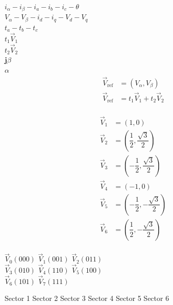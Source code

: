 \documentclass[11pt]{report}
\begin{document}
\begin{center}
	$ i_{\alpha} - i_{\beta} - i_a - i_b - i_c - \theta$ \\
	$ V_{\alpha} - V_{\beta} - i_d - i_q - V_d - V_q $ \\
	$ t_a - t_b - t_c $ \\
	$t_1\vec{V}_1$ \\
	$t_2\vec{V}_2$ \\
	$\mathbf{j}\beta$ \\
	$\alpha$\\


\begin{align*}
	\vec{V}_{\text{ref}} &= (V_{\alpha}, V_{\beta}) \\
	\vec{V}_{\text{ref}} &= t_1\vec{V}_1 + t_2\vec{V}_2\\
\end{align*}

	\begin{align*}
		\vec{V}_1 & = (1, 0)                                           \\
		\vec{V}_2 & = \left(\dfrac{1}{2}, \dfrac{\sqrt{3}}{2}\right)   \\
		\vec{V}_3 & = \left(-\dfrac{1}{2}, \dfrac{\sqrt{3}}{2}\right)  \\
		\vec{V}_4 & = (-1, 0)                                          \\
		\vec{V}_5 & = \left(-\dfrac{1}{2}, -\dfrac{\sqrt{3}}{2}\right) \\
		\vec{V}_6 & = \left(\dfrac{1}{2}, -\dfrac{\sqrt{3}}{2}\right)  \\
	\end{align*}

	$\vec{V}_0(000)$
	$\vec{V}_1(001)$
	$\vec{V}_2(011)$ \\
	$\vec{V}_3(010)$
	$\vec{V}_4(110)$
	$\vec{V}_5(100)$ \\
	$\vec{V}_6(101)$
	$\vec{V}_7(111)$

	Sector 1
	Sector 2
	Sector 3
	Sector 4
	Sector 5
	Sector 6

\end{center}
\end{document}
